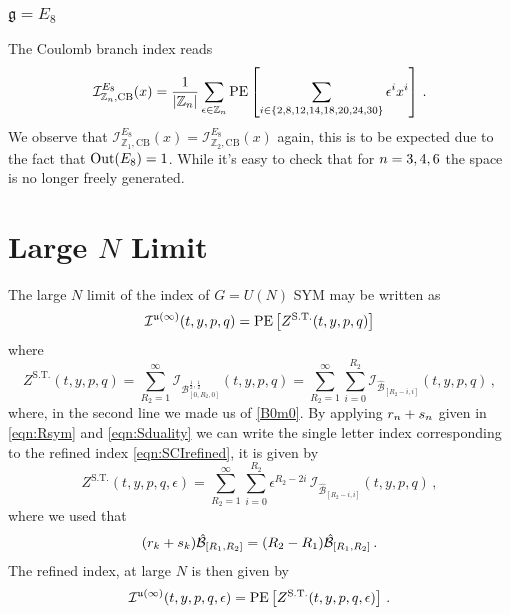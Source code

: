 \documentclass[main.tex]{subfiles}
\begin{document}
\subsubsection{$\mathfrak{g}=E_8$}
The Coulomb branch index reads
\begin{equation}
\mathcal{I}_{\mathbb{Z}_{n},\text{CB}}^{E_8}(x)=\frac{1}{|\mathbb{Z}_{n}|}\sum_{\epsilon\in\mathbb{Z}_{n}}\operatorname{\mathrm{PE}}\left[\sum_{i\in\{2,8,12,14,18,20,24,30\}}\epsilon^i x^i\right]\,.
\end{equation}
We observe that $\mathcal{I}_{\mathbb{Z}_{1},\text{CB}}^{E_8}(x) = \mathcal{I}_{\mathbb{Z}_{2},\text{CB}}^{E_8}(x)$ again, this is to be expected due to the fact that $\operatorname{Out}(E_8)=1$. While it's easy to check that for ${n}=3,4,6$ the space is no longer freely generated. 
\section{Large \texorpdfstring{$N$}{N} Limit}\label{sec:largeN}
The large $N$ limit of the index of $G=U(N)$ SYM may be written as \cite{Kinney:2005ej}
\begin{equation}
\mathcal{I}^{\mathfrak{u}(\infty)}(t,y,p,q)=\operatorname{\mathrm{PE}}\left[Z^{\text{S.T.}}(t,y,p,q)\right]
\end{equation}
where 
\begin{equation}
Z^{\text{S.T.}}(t,y,p,q)=\sum_{R_2=1}^{\infty}\mathcal{I}_{\mathcal{B}_{[0,R_2,0]}^{\frac{1}{2},\frac{1}{2}}}(t,y,p,q)=\sum_{R_2=1}^{\infty}\sum_{i=0}^{R_2}\mathcal{I}_{\hat{\mathcal{B}}_{[R_2-i,i]}}(t,y,p,q)\,,
\end{equation}
where, in the second line we made us of \eqref{B0m0}.
By applying $r_{n}+ s_{n}$ given in \eqref{eqn:Rsym} and \eqref{eqn:Sduality} we can write the single letter index corresponding to the refined index \eqref{eqn:SCIrefined}, it is given by
\begin{equation}
Z^{\text{S.T.}}(t,y,p,q,\epsilon)=\sum_{R_2=1}^{\infty}\sum_{i=0}^{R_2}\epsilon^{R_2-2i}\,\mathcal{I}_{\hat{\mathcal{B}}_{[R_2-i,i]}}(t,y,p,q)\,,
\end{equation}
where we used that
\begin{equation}
(r_k+ s_k)\hat{\mathcal{B}}_{[R_1,R_2]}\color{black}=(R_2-R_1)\hat{\mathcal{B}}_{[R_1,R_2]}\color{black}\,.
\end{equation} 
The refined index, at large $N$ is then given by
\begin{equation}
\mathcal{I}^{\mathfrak{u}(\infty)}(t,y,p,q,\epsilon)=\operatorname{\mathrm{PE}}\left[Z^{\text{S.T.}}(t,y,p,q,\epsilon)\right]\,.
\end{equation}
\end{document}
